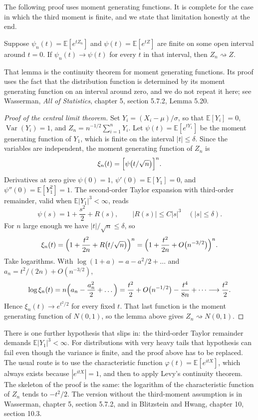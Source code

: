 The following proof uses moment generating functions. It is complete for the case
in which the third moment is finite, and we state that limitation honestly at the
end.

\begin{lemma}
Suppose $\psi_n(t)=\mathbb{E}[e^{tZ_n}]$ and $\psi(t)=\mathbb{E}[e^{tZ}]$ are finite
on some open interval around $t=0$. If $\psi_n(t)\to\psi(t)$ for every $t$ in that
interval, then $Z_n\rightsquigarrow Z$.
\end{lemma}

That lemma is the continuity theorem for moment generating functions. Its proof uses
the fact that the distribution function is determined by its moment generating
function on an interval around zero, and we do not repeat it here; see Wasserman,
\emph{All of Statistics}, chapter 5, section 5.7.2, Lemma 5.20.

\begin{proof}[Proof of the central limit theorem]
Set $Y_i=(X_i-\mu)/\sigma$, so that $\mathbb{E}[Y_i]=0$,
$\operatorname{Var}(Y_i)=1$, and $Z_n=n^{-1/2}\sum_{i=1}^n Y_i$. Let
$\psi(t)=\mathbb{E}[e^{tY_1}]$ be the moment generating function of $Y_1$, which is
finite on the interval $|t|\le\delta$. Since the variables are independent, the
moment generating function of $Z_n$ is
\[
\xi_n(t)=\Bigl[\psi\bigl(t/\sqrt n\bigr)\Bigr]^n .
\]
Derivatives at zero give $\psi(0)=1$, $\psi'(0)=\mathbb{E}[Y_1]=0$, and
$\psi''(0)=\mathbb{E}[Y_1^2]=1$. The second-order Taylor expansion with third-order
remainder, valid when $\mathbb{E}|Y_1|^3<\infty$, reads
\[
\psi(s)=1+\frac{s^2}{2}+R(s),\qquad |R(s)|\le C|s|^3 \quad (|s|\le\delta).
\]
For $n$ large enough we have $|t|/\sqrt n\le\delta$, so
\[
\xi_n(t)=\Bigl(1+\frac{t^2}{2n}+R\bigl(t/\sqrt n\bigr)\Bigr)^n
=\Bigl(1+\frac{t^2}{2n}+O\bigl(n^{-3/2}\bigr)\Bigr)^n .
\]
Take logarithms. With $\log(1+a)=a-a^2/2+\dots$ and
$a_n=t^2/(2n)+O(n^{-3/2})$,
\[
\log\xi_n(t)=n\Bigl(a_n-\frac{a_n^2}{2}+\dots\Bigr)
=\frac{t^2}{2}+O\bigl(n^{-1/2}\bigr)-\frac{t^4}{8n}+\dots
\longrightarrow \frac{t^2}{2}.
\]
Hence $\xi_n(t)\to e^{t^2/2}$ for every fixed $t$. That last function is the moment
generating function of $N(0,1)$, so the lemma above gives
$Z_n\rightsquigarrow N(0,1)$.
\end{proof}

There is one further hypothesis that slips in: the third-order Taylor remainder
demands $\mathbb{E}|Y_1|^3<\infty$. For distributions with very heavy tails that
hypothesis can fail even though the variance is finite, and the proof above has to
be replaced. The usual route is to use the characteristic function
$\varphi(t)=\mathbb{E}[e^{itX}]$, which always exists because $|e^{itX}|=1$, and then
to apply Levy's continuity theorem. The skeleton of the proof is the same: the
logarithm of the characteristic function of $Z_n$ tends to $-t^2/2$. The version
without the third-moment assumption is in Wasserman, chapter 5, section 5.7.2, and
in Blitzstein and Hwang, chapter 10, section 10.3.

